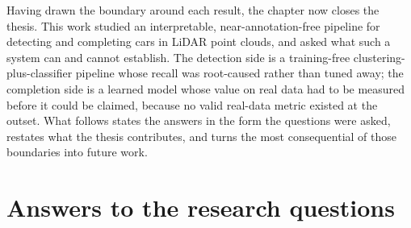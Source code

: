 %
%
%
Having drawn the boundary around each result, the chapter now closes the thesis.
This work studied an interpretable, near-annotation-free pipeline for detecting and
completing cars in LiDAR point clouds, and asked what such a system can and cannot
establish. The detection side is a training-free clustering-plus-classifier pipeline whose
recall was root-caused rather than tuned away; the completion side is a learned model
whose value on real data had to be measured before it could be claimed, because no valid
real-data metric existed at the outset. What follows states the answers in the form the
questions were asked, restates what the thesis contributes, and turns the most
consequential of those boundaries into future work.

\section{Answers to the research questions}
\label{sec:conclusion-rqs}

